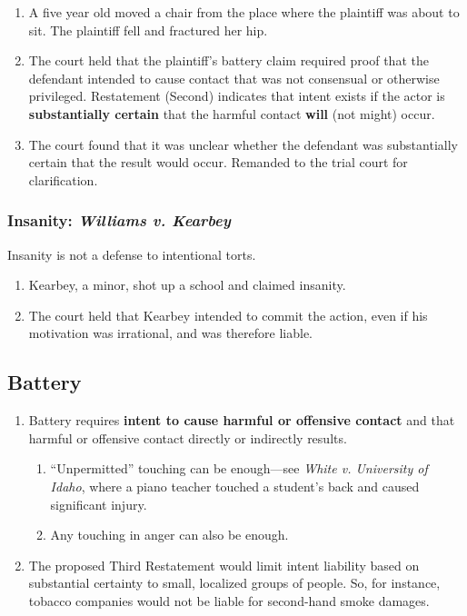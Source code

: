 \begin{enumerate}
    \item A five year old moved a chair from the place where the plaintiff was 
    about to sit. The plaintiff fell and fractured her hip.
    \item The court held that the plaintiff's battery claim required proof 
    that the defendant intended to cause contact that was not consensual or 
    otherwise privileged. Restatement (Second) indicates that intent exists if 
    the actor is \textbf{substantially certain} that the harmful contact 
    \textbf{will} (not might) occur.
    \item The court found that it was unclear whether the defendant was 
    substantially certain that the result would occur. Remanded to the trial 
    court for clarification.
\end{enumerate}

\subsubsection{Insanity: \emph{Williams v. Kearbey}}

Insanity is not a defense to intentional torts.

\begin{enumerate}
    \item Kearbey, a minor, shot up a school and claimed insanity.
    \item The court held that Kearbey intended to commit the action, even if 
    his motivation was irrational, and was therefore liable.
\end{enumerate}

\subsection{Battery}

\begin{enumerate}
    \item Battery requires \textbf{intent to cause harmful or offensive 
    contact} and that harmful or offensive contact directly or indirectly 
    results.
    \begin{enumerate}
        \item ``Unpermitted'' touching can be enough---see \emph{White v.  
        University of Idaho}, where a piano teacher touched a student's back 
        and caused significant injury.
        \item Any touching in anger can also be enough.
    \end{enumerate}
    \item The proposed Third Restatement would limit intent liability based on 
    substantial certainty to small, localized groups of people. So, for 
    instance, tobacco companies would not be liable for second-hand smoke 
    damages.
\end{enumerate}

